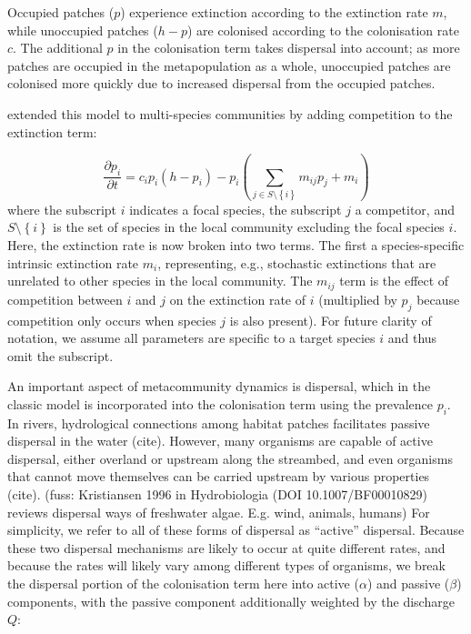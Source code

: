 Occupied patches ($p$) experience extinction according to the extinction rate $m$, while unoccupied patches ($h-p$) are colonised according to the colonisation rate $c$. 
The additional $p$ in the colonisation term takes dispersal into account; as more patches are occupied in the metapopulation as a whole, unoccupied patches are colonised more quickly due to increased dispersal from the occupied patches.

\textcite{Hunt2009} extended this model to multi-species communities by adding competition to the extinction term:

\begin{equation}
	\frac{\partial p_i}{\partial t} = c_i p_i \left( h-p_i \right) - p_i \left( \sum_{j \in S \setminus \left\{i \right\} }{m_{ij}p_j} + m_i \right) \label{eq:hunt}
\end{equation}
where the subscript $i$ indicates a focal species, the subscript $j$ a competitor, and $S \setminus \left\{i \right\}$ is the set of species in the local community excluding the focal species $i$.
Here, the extinction rate is now broken into two terms.
The first a species-specific intrinsic extinction rate $m_i$, representing, e.g., stochastic extinctions that are unrelated to other species in the local community.
The $m_{ij}$ term is the effect of competition between $i$ and $j$ on the extinction rate of $i$ (multiplied by $p_j$ because competition only occurs when species $j$ is also present).
For future clarity of notation, we assume all parameters are specific to a target species $i$ and thus omit the subscript.

An important aspect of metacommunity dynamics is dispersal, which in the classic model is incorporated into the colonisation term using the prevalence $p_i$.
In rivers, hydrological connections among habitat patches facilitates passive dispersal in the water (cite).
However, many organisms are capable of active dispersal, either overland or upstream along the streambed, and even organisms that cannot move themselves can be carried upstream by various properties (cite). (fuss: Kristiansen 1996 in Hydrobiologia (DOI 10.1007/BF00010829) reviews dispersal ways of freshwater algae. E.g. wind, animals, humans)
For simplicity, we refer to all of these forms of dispersal as “active” dispersal.
Because these two dispersal mechanisms are likely to occur at quite different rates, and because the rates will likely vary among different types of organisms, we break the dispersal portion of the colonisation term here into active ($\alpha$) and passive ($\beta$) components, with the passive component additionally weighted by the discharge $Q$:

